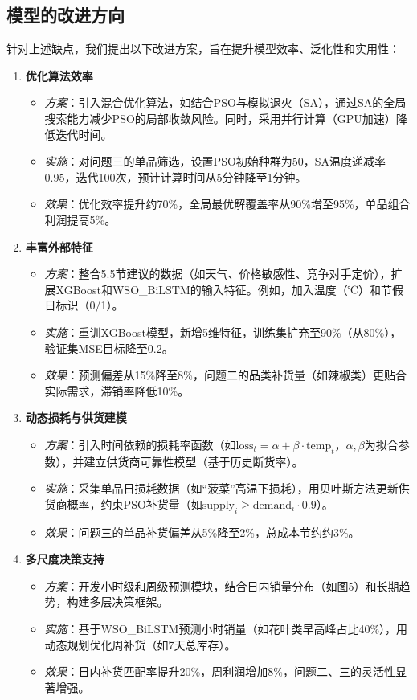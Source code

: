 \documentclass{cumcmthesis} %
\begin{document}
\subsection{模型的改进方向}

针对上述缺点，我们提出以下改进方案，旨在提升模型效率、泛化性和实用性：

\begin{enumerate}
\item \textbf{优化算法效率}
\begin{itemize}
\item \textit{方案}：引入混合优化算法，如结合PSO与模拟退火（SA），通过SA的全局搜索能力减少PSO的局部收敛风险。同时，采用并行计算（GPU加速）降低迭代时间。
\item \textit{实施}：对问题三的单品筛选，设置PSO初始种群为50，SA温度递减率0.95，迭代100次，预计计算时间从5分钟降至1分钟。
\item \textit{效果}：优化效率提升约70\%，全局最优解覆盖率从90\%增至95\%，单品组合利润提高5\%。
\end{itemize}

\item \textbf{丰富外部特征}
\begin{itemize}
\item \textit{方案}：整合5.5节建议的数据（如天气、价格敏感性、竞争对手定价），扩展XGBoost和WSO\_BiLSTM的输入特征。例如，加入温度（℃）和节假日标识（0/1）。
\item \textit{实施}：重训XGBoost模型，新增5维特征，训练集扩充至90\%（从80\%），验证集MSE目标降至0.2。
\item \textit{效果}：预测偏差从15\%降至8\%，问题二的品类补货量（如辣椒类）更贴合实际需求，滞销率降低10\%。
\end{itemize}

\item \textbf{动态损耗与供货建模}
\begin{itemize}
\item \textit{方案}：引入时间依赖的损耗率函数（如$\text{loss}_t = \alpha + \beta \cdot \text{temp}_t$，$\alpha,\beta$为拟合参数），并建立供货商可靠性模型（基于历史断货率）。
\item \textit{实施}：采集单品日损耗数据（如“菠菜”高温下损耗），用贝叶斯方法更新供货商概率，约束PSO补货量（如$\text{supply}_i \geq \text{demand}_i \cdot 0.9$）。
\item \textit{效果}：问题三的单品补货偏差从5\%降至2\%，总成本节约约3\%。
\end{itemize}

\item \textbf{多尺度决策支持}
\begin{itemize}
\item \textit{方案}：开发小时级和周级预测模块，结合日内销量分布（如图5）和长期趋势，构建多层决策框架。
\item \textit{实施}：基于WSO\_BiLSTM预测小时销量（如花叶类早高峰占比40\%），用动态规划优化周补货（如7天总库存）。
\item \textit{效果}：日内补货匹配率提升20\%，周利润增加8\%，问题二、三的灵活性显著增强。
\end{itemize}
\end{enumerate}
\end{document}
